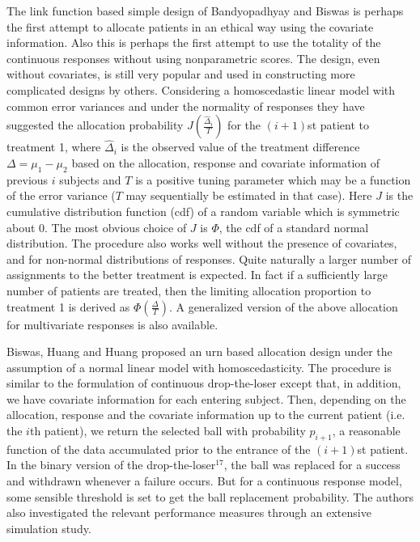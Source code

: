 The link function based simple design of Bandyopadhyay and Biswas\cite{60} is perhaps the first
attempt to allocate patients in an ethical way using the covariate
information. Also this is perhaps the first attempt to use the totality of the continuous responses without using nonparametric scores. The design, even without covariates, is still very popular and used in constructing more complicated designs by others. Considering a homoscedastic linear model with common error variances and under the normality of responses they have suggested the allocation probability $J(\frac{\hat{\Delta}_{i}}{T})$ for the $(i+1)$st patient to treatment 1, where ${\hat\Delta}_{i}$ is the observed value of the treatment difference $\Delta=\mu_1-\mu_2$ based on the allocation, response and covariate information of previous $i$ subjects and $T$ is a positive tuning parameter which may be a function of the error variance ($T$ may sequentially be estimated in that case). Here $J$ is the cumulative distribution function (cdf) of a random variable which is symmetric about 0. The most obvious choice of $J$ is $\Phi$, the cdf of a standard normal distribution. The procedure also works well without the presence of covariates, and for non-normal distributions of responses. Quite naturally a larger number of assignments to the better treatment is expected. In fact if a sufficiently large number of patients are treated, then the limiting allocation proportion to treatment 1 is derived as
$\Phi(\frac{\Delta}{T})$. A generalized version of the above allocation for multivariate responses is also available\cite{61}.

Biswas, Huang and Huang\cite{62} proposed an urn based
allocation design under the assumption of a normal linear model
with homoscedasticity. The procedure is similar to the formulation of
continuous drop-the-loser\cite{31} except that, in addition, we have covariate information for each entering subject.
Then, depending on the allocation, response and the covariate
information up to the current patient (i.e. the $i$th patient), we return the selected ball with probability $p_{i+1}$, a reasonable function
of the data accumulated prior to the entrance of the $(i+1)$st patient. In the binary version of the drop-the-loser$^{17}$, the ball was replaced for a success and withdrawn whenever a failure occurs.
But for a continuous response model, some sensible threshold is set  to get the ball replacement probability\cite{62}. The authors also investigated the relevant performance measures through an extensive simulation study.

